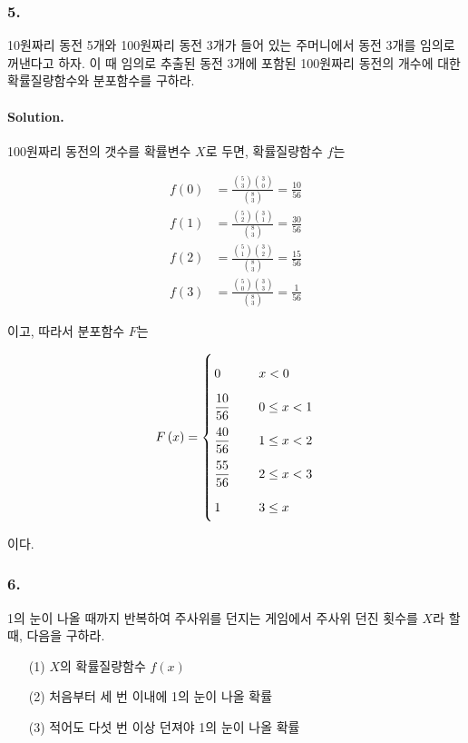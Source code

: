 \subsubsection{5.} 10원짜리 동전 5개와 100원짜리 동전 3개가 들어 있는 주머니에서 동전 3개를 임의로 꺼낸다고 하자. 이 때 임의로 추출된 동전 3개에 포함된 100원짜리 동전의 개수에 대한 확률질량함수와 분포함수를 구하라.

\paragraph{Solution.} 100원짜리 동전의 갯수를 확률변수 $X$로 두면, 확률질량함수 $f$는

\begin{align*}
	f\left(0\right) &= \frac{\binom{5}{3}\binom{3}{0}}{\binom{8}{3}} = \frac{10}{56} \\
	f\left(1\right) &= \frac{\binom{5}{2}\binom{3}{1}}{\binom{8}{3}} = \frac{30}{56} \\
	f\left(2\right) &= \frac{\binom{5}{1}\binom{3}{2}}{\binom{8}{3}} = \frac{15}{56} \\
	f\left(3\right) &= \frac{\binom{5}{0}\binom{3}{3}}{\binom{8}{3}} = \frac{1}{56}
\end{align*}

이고, 따라서 분포함수 $F$는

\[
\arraycolsep=1.4pt\def\arraystretch{2.2}
F\left(x\right) = \left\{
\begin{array}{ll}
	0 & \qquad x < 0 \\
	\dfrac{10}{56} & \qquad 0 \leq x < 1 \\
	\dfrac{40}{56} & \qquad 1 \leq x < 2 \\
	\dfrac{55}{56} & \qquad 2 \leq x < 3 \\
	1 & \qquad 3 \leq x
\end{array}
\right.
\]

이다.

\subsubsection{6.} 1의 눈이 나올 때까지 반복하여 주사위를 던지는 게임에서 주사위 던진 횟수를 $X$라 할 때, 다음을 구하라.
\begin{itemize}
	\item[(1)] $X$의 확률질량함수 $f\left(x\right)$
	\item[(2)] 처음부터 세 번 이내에 1의 눈이 나올 확률
	\item[(3)] 적어도 다섯 번 이상 던져야 1의 눈이 나올 확률
\end{itemize}

